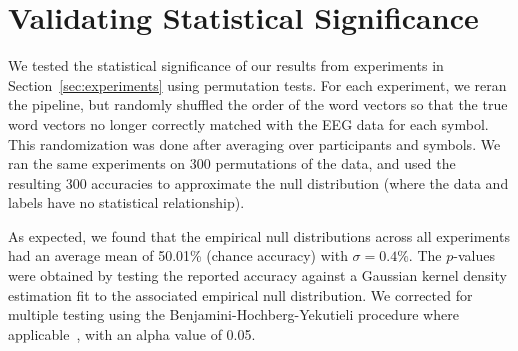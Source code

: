 \section{Validating Statistical Significance}
We tested the statistical significance of our results from experiments in 
Section~\ref{sec:experiments} using permutation tests. For each experiment, we 
reran the pipeline, but randomly shuffled the order of the word vectors so that 
the true word vectors no longer correctly matched with the EEG data for each 
symbol. This randomization was done after averaging over participants and 
symbols. We ran the same experiments on 300 permutations of the data, and used 
the resulting 300 \tvt accuracies to approximate the null distribution (where 
the data and labels have no statistical relationship). 

As expected, we found that the empirical null distributions across all 
experiments had an average mean of 50.01\% (chance accuracy) with $\sigma = 
0.4\%$. The $p$-values were obtained by testing the reported accuracy against a 
Gaussian kernel density estimation fit to the associated empirical null 
distribution. We corrected for multiple testing using the 
Benjamini-Hochberg-Yekutieli procedure where 
applicable~\cite{benjamini2001control}, with an alpha value of 0.05.
